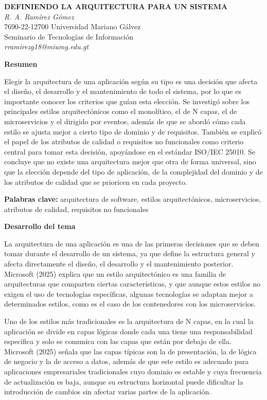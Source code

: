\documentclass[12pt,letterpaper]{article}
\newcommand{\subtitulo}[1]{\vspace{12pt}\noindent\textbf{#1}\par\vspace{10pt}}
\begin{document}
\begin{center}
\textbf{DEFINIENDO LA ARQUITECTURA PARA UN SISTEMA}\\[8pt]
\textit{R. A. Ramírez Gómez}\\
7690-22-12700 Universidad Mariano Gálvez\\
Seminario de Tecnologías de Información\\
\textit{rramirezg18@miumg.edu.gt}
\end{center}

\vspace{10pt}

\subtitulo{Resumen}
Elegir la arquitectura de una aplicación según su tipo es una decisión que afecta el diseño, el desarrollo y el mantenimiento de todo el sistema, por lo que es importante conocer los criterios que guían esta elección. Se investigó sobre los principales estilos arquitectónicos como el monolítico, el de N capas, el de microservicios y el dirigido por eventos, además de que se abordó cómo cada estilo se ajusta mejor a cierto tipo de dominio y de requisitos. También se explicó el papel de los atributos de calidad o requisitos no funcionales como criterio central para tomar esta decisión, apoyándose en el estándar ISO/IEC 25010. Se concluye que no existe una arquitectura mejor que otra de forma universal, sino que la elección depende del tipo de aplicación, de la complejidad del dominio y de los atributos de calidad que se prioricen en cada proyecto.

\vspace{10pt}
\noindent\textbf{Palabras clave:} arquitectura de software, estilos arquitectónicos, microservicios, atributos de calidad, requisitos no funcionales

\vspace{6pt}

\subtitulo{Desarrollo del tema}

La arquitectura de una aplicación es una de las primeras decisiones que se deben tomar durante el desarrollo de un sistema, ya que define la estructura general y afecta directamente el diseño, el desarrollo y el mantenimiento posterior. Microsoft (2025) explica que un estilo arquitectónico es una familia de arquitecturas que comparten ciertas características, y que aunque estos estilos no exigen el uso de tecnologías específicas, algunas tecnologías se adaptan mejor a determinados estilos, como es el caso de los contenedores con los microservicios.
 
Uno de los estilos más tradicionales es la arquitectura de N capas, en la cual la aplicación se divide en capas lógicas donde cada una tiene una responsabilidad específica y solo se comunica con las capas que están por debajo de ella. Microsoft (2025) señala que las capas típicas son la de presentación, la de lógica de negocio y la de acceso a datos, además de que este estilo es adecuado para aplicaciones empresariales tradicionales cuyo dominio es estable y cuya frecuencia de actualización es baja, aunque su estructura horizontal puede dificultar la introducción de cambios sin afectar varias partes de la aplicación.
 
\end{document}

